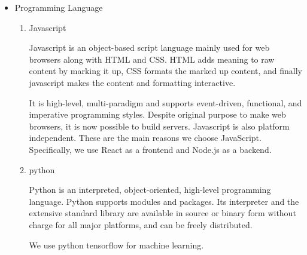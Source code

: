 \documentclass[conference]{IEEEtran}
\begin{document}
\begin{itemize}
    \item Programming Language
    \begin{enumerate}
    \setlength{\parindent}{2ex}
    \item Javascript
    
    Javascript is an object-based script language mainly used for web browsers along with HTML and CSS. HTML adds meaning to raw content by marking it up, CSS formats the marked up content, and finally javascript makes the content and formatting interactive.
    
    It is high-level, multi-paradigm and supports event-driven, functional, and imperative programming styles. Despite original purpose to make web browsers, it is now possible to build servers. Javascript is also platform independent. These are the main reasons we choose JavaScript. Specifically, we use React as a frontend and Node.js as a backend.
    \item python
    
    Python is an interpreted, object-oriented, high-level programming language. Python supports modules and packages. Its interpreter and the extensive standard library are available in source or binary form without charge for all major platforms, and can be freely distributed.
    
    We use python tensorflow for machine learning.

    \end{enumerate}
\end{itemize}
\vspace{0.5mm}
\end{document}
